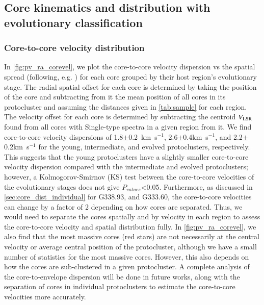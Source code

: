 \documentclass[longauth]{aa} %
\newcommand{\vlsr}{\mbox{$V_{\rm LSR}$\,}}
\newcommand{\kms}{\textrm{km~s}\ensuremath{^{-1}}\xspace}       %
\begin{document}
\subsection{Core kinematics and distribution with evolutionary classification}

\subsubsection{Core-to-core velocity distribution}

In \cref{fig:pv_ra_corevel}, we plot the core-to-core velocity dispersion vs the spatial spread (following, e.g. \citealt{Stutz2016}) for each core grouped by their host region's evolutionary stage. The radial spatial offset for each core is determined by taking the position of the core and subtracting from it the mean position of all cores in its protocluster and assuming the distances given in \cref{tab:sample} for each region. 
The velocity offset for each core is determined by subtracting the centroid \vlsr found from all cores with Single-type spectra in a given region from it. We find core-to-core velocity dispersions of 1.8$\pm$0.2~\kms, 2.6$\pm$0.4\kms, and 2.2$\pm$0.2\kms for the young, intermediate, and evolved protoclusters, respectively. This suggests that the young protoclusters have a slightly smaller core-to-core velocity dispersion compared with the intermediate and evolved protoclusters; however, a Kolmogorov-Smirnov (KS) test between the core-to-core velocities of the evolutionary stages does not give $P_{values}$<0.05. Furthermore, as discussed in \cref{sec:core_dist_individual} for G338.93, and G333.60, the core-to-core velocities can change by a factor of 2 depending on how cores are separated. Thus, we would need to separate the cores spatially and by velocity in each region to assess the core-to-core velocity and spatial distribution fully. 
In \cref{fig:pv_ra_corevel}, we also find that the most massive cores (red stars) are not necessarily at the central velocity or average central position of the protocluster, although we have a small number of statistics for the most massive cores. However, this also depends on how the cores are sub-clustered in a given protocluster. A complete analysis of the core-to-envelope dispersion will be done in future works, along with the separation of cores in individual protoclusters to estimate the core-to-core velocities more accurately.
\end{document}
